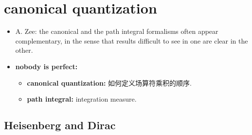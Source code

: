 \chapter{canonical quantization}
\begin{itemize}
	\item A. Zee: the canonical and the path integral formalisms often appear complementary, in the sense that results difficult to see in one are clear in the other.
	
	\item \textbf{nobody is perfect:}
	\begin{itemize}
		\item \textbf{canonical quantization:} 如何定义场算符乘积的顺序.
		
		\item \textbf{path integral:} integration measure.
	\end{itemize}
\end{itemize}

\section{Heisenberg and Dirac}
